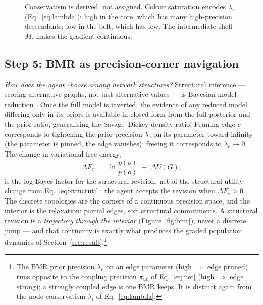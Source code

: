 \begin{figure}[t]
\caption{Conservatism is derived, not assigned. Colour saturation
encodes $\lambda_i$ (Eq.~\ref{eq:lambda}): high in the core, which has
many high-precision descendants; low in the belt, which has few. The
intermediate shell $M_i$ makes the gradient continuous.}
\label{fig:conservatism}
\end{figure}

\subsection{Step 5: BMR as precision-corner navigation}
\label{ssec:bmr}

\noindent\textit{How does the agent choose among network structures?}
Structural inference --- scoring alternative graphs, not just alternative
values --- is Bayesian model reduction \citep{Friston2018_2, fristonPenny2011PostHocBMS}.%
Once the full model is inverted, the evidence of any reduced model
differing only in its priors is available in closed form from the full
posterior and the prior ratio, generalising the Savage--Dickey density
ratio. Pruning edge $e$ corresponds to tightening the prior precision
$\lambda_e$ on its parameter toward infinity (the parameter is pinned,
the edge vanishes); freeing it corresponds to $\lambda_e \to 0$. The
change in variational free energy,
\begin{equation}
\Delta F_e \;=\; \ln \frac{\tilde p(o)}{p(o)}
\;-\; \Delta U(G),
\label{eq:bmr}
\end{equation}
is the log Bayes factor for the structural revision, net of the
structural-utility change from Eq.~\eqref{eq:structutil}; the agent
accepts the revision when $\Delta F_e > 0$. The discrete topologies are
the corners of a continuous precision space, and the interior is the
relaxation: partial edges, soft structural commitments. A structural
revision is a \emph{trajectory through the interior}
(Figure~\ref{fig:bmr}), never a discrete jump --- and that continuity is
exactly what produces the graded population dynamics of
Section~\ref{sec:result}.\footnote{The BMR prior precision $\lambda_e$
on an edge parameter (high $\Rightarrow$ edge pruned) runs opposite to
the coupling precision $\pi_{uv}$ of Eq.~\eqref{eq:net} (high
$\Rightarrow$ edge strong); a strongly coupled edge is one BMR keeps. It
is distinct again from the node conservatism $\lambda_i$ of
Eq.~\eqref{eq:lambda}.}

